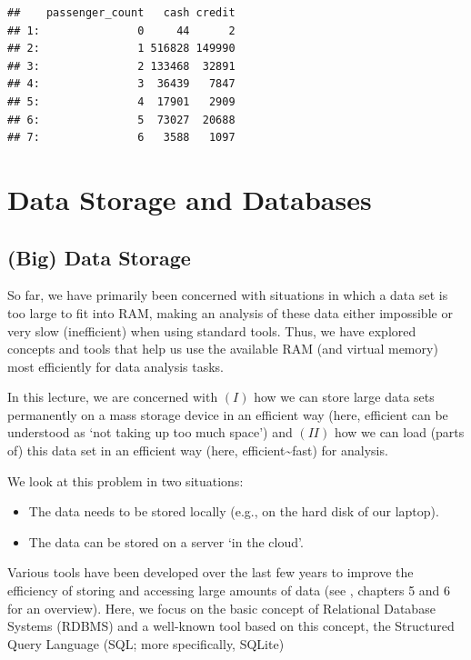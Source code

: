 \documentclass[
  12pt,
]{style/krantz}
\providecommand{\tightlist}{%
  \setlength{\itemsep}{0pt}\setlength{\parskip}{0pt}}
\begin{document}
\begin{verbatim}
##    passenger_count   cash credit
## 1:               0     44      2
## 2:               1 516828 149990
## 3:               2 133468  32891
## 4:               3  36439   7847
## 5:               4  17901   2909
## 6:               5  73027  20688
## 7:               6   3588   1097
\end{verbatim}

\hypertarget{data-storage-and-databases}{%
\chapter{Data Storage and Databases}\label{data-storage-and-databases}}

\hypertarget{big-data-storage}{%
\section{(Big) Data Storage}\label{big-data-storage}}

So far, we have primarily been concerned with situations in which a data set is too large to fit into RAM, making an analysis of these data either impossible or very slow (inefficient) when using standard tools. Thus, we have explored concepts and tools that help us use the available RAM (and virtual memory) most efficiently for data analysis tasks.

In this lecture, we are concerned with \((I)\) how we can store large data sets permanently on a mass storage device in an efficient way (here, efficient can be understood as `not taking up too much space') and \((II)\) how we can load (parts of) this data set in an efficient way (here, efficient\textasciitilde fast) for analysis.

We look at this problem in two situations:

\begin{itemize}
\tightlist
\item
  The data needs to be stored locally (e.g., on the hard disk of our laptop).
\item
  The data can be stored on a server `in the cloud'.
\end{itemize}

Various tools have been developed over the last few years to improve the efficiency of storing and accessing large amounts of data (see \citet{walkowiak_2016}, chapters 5 and 6 for an overview). Here, we focus on the basic concept of Relational Database Systems (RDBMS) and a well-known tool based on this concept, the Structured Query Language (SQL; more specifically, SQLite)
\end{document}

